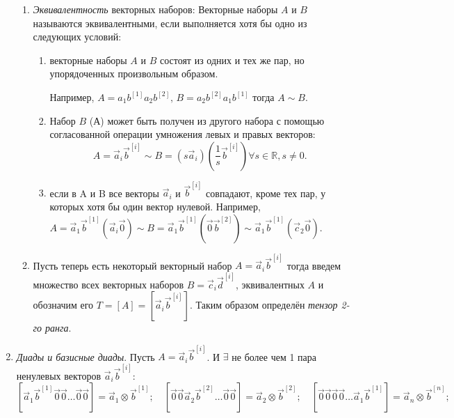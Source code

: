 \begin{definition}
\begin{enumerate}
\begin{enumerate}
        \item \emph{Эквивалентность} векторных наборов:
          Векторные наборы $A$ и $B$ называются эквивалентными, если выполняется хотя бы одно 
          из следующих условий:
          \begin{enumerate}
            \item векторные наборы $A$ и $B$ состоят из одних и тех же пар, но упорядоченных
              произвольным образом.
              
              Например,
                $A = a_1 b^{[1]} a_2 b^{[2]}, \, B = a_2 b^{[2]} a_1 b^{[1]}$ тогда $A \sim B$.

            \item Набор $B$ (А) может быть получен из другого набора с помощью согласованной операции
              умножения левых и правых векторов:
              \[
                A = \vec{a}_i \vec{b}^{[i]} \sim B = (s \vec{a}_i) (\dfrac{1}{s} \vec{b}^{[i]})
                \forall s \in \mathbb{R}, s \neq 0.
              \]

            \item если в A и B все векторы $\vec{a}_i$ и $\vec{b}^{[i]}$ совпадают, кроме тех пар,
              у которых хотя бы один вектор нулевой.
              Например,
              $A=\vec{a}_1 \vec{b}^{[1]} (\vec{a}_i \vec{0}) \sim B = \vec{a}_1 \vec{b}^{[1]} (\vec{0} \vec{b}^{[2]}) \sim \vec{a}_1 \vec{b}^{[1]} (\vec{c}_{2} \vec{0})$.
          \end{enumerate}

        \item Пусть теперь есть некоторый векторный набор $A = \vec{a}_i \vec{b}^{[i]}$ тогда введем 
          множество всех векторных наборов $B = \vec{c}_i \vec{d}^{[i]}$, эквивалентных $A$ и
          обозначим его $T = [A] = [\vec{a}_i \vec{b}^{[i]}]$. Таким образом определён
          \emph{тензор 2-го ранга}.
    \end{enumerate}

  \item \emph{Диады и базисные диады}. Пусть $A = \vec{a}_i \vec{b}^{[i]}$. И 
    $\exists$ не более чем 1 пара ненулевых векторов $\vec{a}_i \vec{b}^{[i]}$:
    \[
      [\vec{a}_1 \vec{b}^{[1]} \vec{0} \vec{0} \dots \vec{0} \vec{0}] = \vec{a}_1 \otimes \vec{b}^{[1]}; \quad
      [\vec{0} \vec{0} \vec{a}_2 \vec{b}^{[2]} \dots \vec{0} \vec{0}] = \vec{a}_2 \otimes \vec{b}^{[2]}; \quad
      [\vec{0} \vec{0} \vec{0} \vec{0} \dots \vec{a}_1 \vec{b}^{[1]}] = \vec{a}_n \otimes \vec{b}^{[n]};
    \]


\end{enumerate}
\end{definition}
